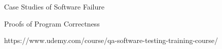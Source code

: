 

Case Studies of Software Failure

Proofs of Program Correctness

https://www.udemy.com/course/qa-software-testing-training-course/